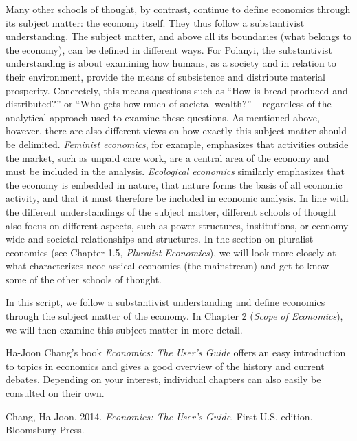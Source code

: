 \documentclass[
  british,
  a4paper,
  DIV=11,
  numbers=noendperiod,
  oneside,
  openany]{scrreprt}
\begin{document}
Many other schools of thought, by contrast, continue to define economics
through its subject matter: the economy itself. They thus follow a
substantivist understanding. The subject matter, and above all its
boundaries (what belongs to the economy), can be defined in different
ways. For Polanyi, the substantivist understanding is about examining
how humans, as a society and in relation to their environment, provide
the means of subsistence and distribute material prosperity. Concretely,
this means questions such as ``How is bread produced and distributed?''
or ``Who gets how much of societal wealth?'' -- regardless of the
analytical approach used to examine these questions. As mentioned above,
however, there are also different views on how exactly this subject
matter should be delimited. \emph{Feminist economics}, for example,
emphasizes that activities outside the market, such as unpaid care work,
are a central area of the economy and must be included in the analysis.
\emph{Ecological economics} similarly emphasizes that the economy is
embedded in nature, that nature forms the basis of all economic
activity, and that it must therefore be included in economic analysis.
In line with the different understandings of the subject matter,
different schools of thought also focus on different aspects, such as
power structures, institutions, or economy-wide and societal
relationships and structures. In the section on pluralist economics (see
Chapter 1.5, \emph{Pluralist Economics}), we will look more closely at
what characterizes neoclassical economics (the mainstream) and get to
know some of the other schools of thought.

In this script, we follow a substantivist understanding and define
economics through the subject matter of the economy. In Chapter 2
(\emph{Scope of Economics}), we will then examine this subject matter in
more detail.

\begin{tcolorbox}[enhanced jigsaw, arc=.35mm, bottomrule=.15mm, bottomtitle=1mm, breakable, colback=white, colbacktitle=quarto-callout-note-color!10!white, colframe=quarto-callout-note-color-frame, coltitle=black, left=2mm, leftrule=.75mm, opacityback=0, opacitybacktitle=0.6, rightrule=.15mm, title={Further reading}, titlerule=0mm, toprule=.15mm, toptitle=1mm]

Ha-Joon Chang's book \emph{Economics: The User's Guide} offers an easy
introduction to topics in economics and gives a good overview of the
history and current debates. Depending on your interest, individual
chapters can also easily be consulted on their own.

Chang, Ha-Joon. 2014. \emph{Economics: The User's Guide}. First U.S.
edition. Bloomsbury Press.

\end{tcolorbox}
\end{document}
